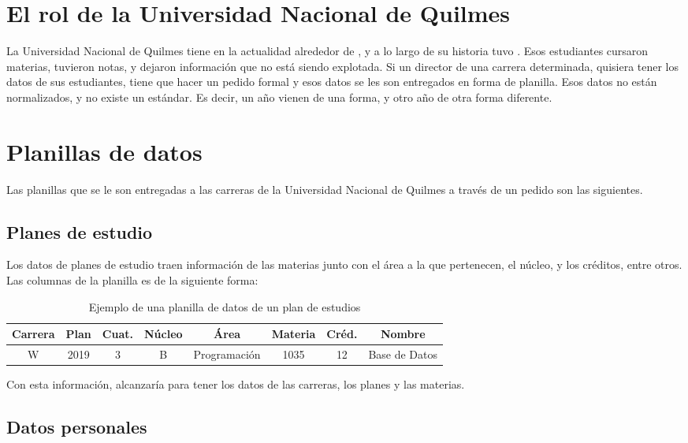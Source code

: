 \section[El rol de la Universidad Nacional de Quilmes]{El rol de la Universidad Nacional de Quilmes}

La Universidad Nacional de Quilmes tiene en la actualidad alrededor de , y a lo largo de su historia tuvo . Esos estudiantes cursaron materias, tuvieron notas, y dejaron información que no está siendo explotada.
Si un director de una carrera determinada, quisiera tener los datos de sus estudiantes, tiene que hacer un pedido formal y esos datos se les son entregados en forma de planilla. Esos datos no están normalizados, y no existe un estándar. Es decir, un año vienen de una forma, y otro año de otra forma diferente.

\section[Planillas de datos]{Planillas de datos}

Las planillas que se le son entregadas a las carreras de la Universidad Nacional de Quilmes a través de un pedido son las siguientes.

\subsection[Planes de estudio]{Planes de estudio}

Los datos de planes de estudio traen información de las materias junto con el área a la que pertenecen, el núcleo, y los créditos, entre otros.
Las columnas de la planilla es de la siguiente forma:

\begin{table}[!htbp]
    \centering
    \begin{tabular}{|c|c|c|c|c|c|c|c|}
    \hline
    Carrera & Plan & Cuat. & Núcleo & Área & Materia & Créd. & Nombre \\ \hline
    W & 2019 & 3 & B & Programación & 1035 & 12 & Base de Datos  \\
    \hline
    \end{tabular}
    \caption{Ejemplo de una planilla de datos de un plan de estudios}
    \label{tab:tabla_planes}
\end{table}

Con esta información, alcanzaría para tener los datos de las carreras, los planes y las materias.

\subsection[Datos personales]{Datos personales}

